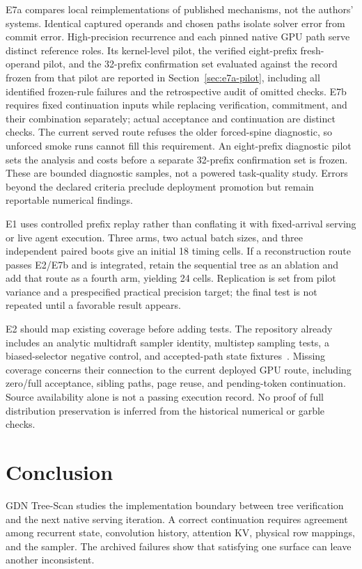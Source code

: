\documentclass[conference]{IEEEtran}
\newcommand{\sys}{GDN Tree-Scan}
\begin{document}
E7a compares local reimplementations of published mechanisms, not the authors' systems. Identical captured operands and chosen paths isolate solver error from commit error. High-precision recurrence and each pinned native GPU path serve distinct reference roles. Its kernel-level pilot, the verified eight-prefix fresh-operand pilot, and the 32-prefix confirmation set evaluated against the record frozen from that pilot are reported in Section~\ref{sec:e7a-pilot}, including all identified frozen-rule failures and the retrospective audit of omitted checks. E7b requires fixed continuation inputs while replacing verification, commitment, and their combination separately; actual acceptance and continuation are distinct checks. The current served route refuses the older forced-spine diagnostic, so unforced smoke runs cannot fill this requirement. An eight-prefix diagnostic pilot sets the analysis and costs before a separate 32-prefix confirmation set is frozen. These are bounded diagnostic samples, not a powered task-quality study. Errors beyond the declared criteria preclude deployment promotion but remain reportable numerical findings.

E1 uses controlled prefix replay rather than conflating it with fixed-arrival serving or live agent execution. Three arms, two actual batch sizes, and three independent paired boots give an initial 18 timing cells. If a reconstruction route passes E2/E7b and is integrated, retain the sequential tree as an ablation and add that route as a fourth arm, yielding 24 cells. Replication is set from pilot variance and a prespecified practical precision target; the final test is not repeated until a favorable result appears.

E2 should map existing coverage before adding tests. The repository already includes an analytic multidraft sampler identity, multistep sampling tests, a biased-selector negative control, and accepted-path state fixtures~\cite{lumo2026archive}. Missing coverage concerns their connection to the current deployed GPU route, including zero/full acceptance, sibling paths, page reuse, and pending-token continuation. Source availability alone is not a passing execution record. No proof of full distribution preservation is inferred from the historical numerical or garble checks.

\section{Conclusion}
\sys{} studies the implementation boundary between tree verification and the next native serving iteration. A correct continuation requires agreement among recurrent state, convolution history, attention KV, physical row mappings, and the sampler. The archived failures show that satisfying one surface can leave another inconsistent.
\end{document}
